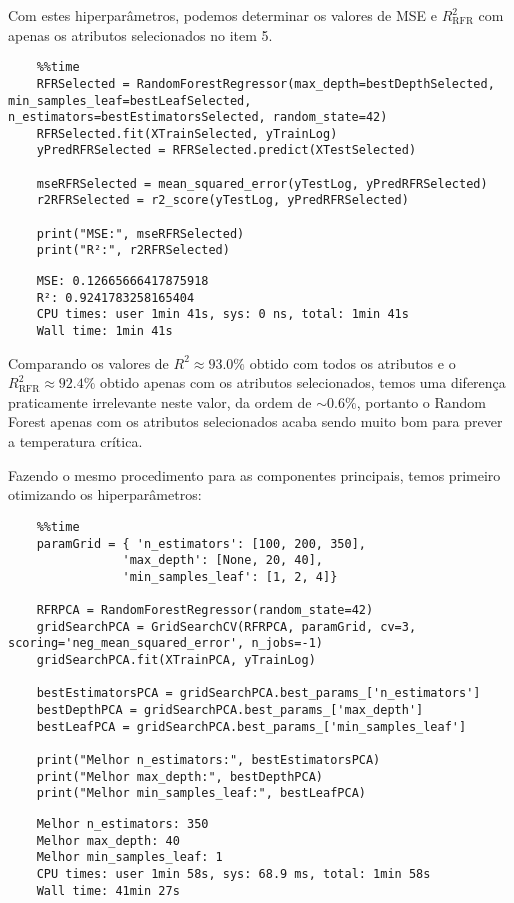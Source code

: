Com estes hiperparâmetros, podemos determinar os valores de MSE e $R^{2}_{\text{RFR}}$ com apenas os atributos selecionados no item 5.
\begin{longlisting}
    \begin{verbatim}
    %%time
    RFRSelected = RandomForestRegressor(max_depth=bestDepthSelected, min_samples_leaf=bestLeafSelected, n_estimators=bestEstimatorsSelected, random_state=42)
    RFRSelected.fit(XTrainSelected, yTrainLog)
    yPredRFRSelected = RFRSelected.predict(XTestSelected)

    mseRFRSelected = mean_squared_error(yTestLog, yPredRFRSelected)
    r2RFRSelected = r2_score(yTestLog, yPredRFRSelected)

    print("MSE:", mseRFRSelected)
    print("R²:", r2RFRSelected)
    \end{verbatim}
\end{longlisting}
\begin{verbatim}
    MSE: 0.12665666417875918
    R²: 0.9241783258165404
    CPU times: user 1min 41s, sys: 0 ns, total: 1min 41s
    Wall time: 1min 41s
\end{verbatim}

Comparando os valores de $R^{2} \approx 93.0\%$ obtido com todos os atributos e o $R^{2}_{\text{RFR}} \approx 92.4\%$ obtido apenas com os atributos selecionados, temos uma diferença praticamente irrelevante neste valor, da ordem de $\sim 0.6\%$, portanto o Random Forest apenas com os atributos selecionados acaba sendo muito bom para prever a temperatura crítica.

Fazendo o mesmo procedimento para as componentes principais, temos primeiro otimizando os hiperparâmetros:
\begin{longlisting}
    \begin{verbatim}
    %%time
    paramGrid = { 'n_estimators': [100, 200, 350],
                'max_depth': [None, 20, 40],
                'min_samples_leaf': [1, 2, 4]}

    RFRPCA = RandomForestRegressor(random_state=42)
    gridSearchPCA = GridSearchCV(RFRPCA, paramGrid, cv=3, scoring='neg_mean_squared_error', n_jobs=-1)
    gridSearchPCA.fit(XTrainPCA, yTrainLog)

    bestEstimatorsPCA = gridSearchPCA.best_params_['n_estimators']
    bestDepthPCA = gridSearchPCA.best_params_['max_depth']
    bestLeafPCA = gridSearchPCA.best_params_['min_samples_leaf']

    print("Melhor n_estimators:", bestEstimatorsPCA)
    print("Melhor max_depth:", bestDepthPCA)
    print("Melhor min_samples_leaf:", bestLeafPCA)
    \end{verbatim}
\end{longlisting}
\begin{verbatim}
    Melhor n_estimators: 350
    Melhor max_depth: 40
    Melhor min_samples_leaf: 1
    CPU times: user 1min 58s, sys: 68.9 ms, total: 1min 58s
    Wall time: 41min 27s
\end{verbatim}

